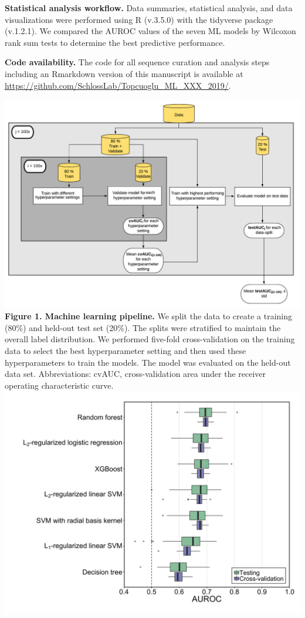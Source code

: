 \documentclass[11pt,]{article}
\begin{document}
\textbf{Statistical analysis workflow.} Data summaries, statistical
analysis, and data visualizations were performed using R (v.3.5.0) with
the tidyverse package (v.1.2.1). We compared the AUROC values of the
seven ML models by Wilcoxon rank sum tests to determine the best
predictive performance.

\textbf{Code availability.} The code for all sequence curation and
analysis steps including an Rmarkdown version of this manuscript is
available at \url{https://github.com/SchlossLab/Topcuoglu_ML_XXX_2019/}.

\newpage

\includegraphics{Figure_1.pdf} \textbf{Figure 1. Machine learning
pipeline. } We split the data to create a training (80\%) and held-out
test set (20\%). The splits were stratified to maintain the overall
label distribution. We performed five-fold cross-validation on the
training data to select the best hyperparameter setting and then used
these hyperparameters to train the models. The model was evaluated on
the held-out data set. Abbreviations: cvAUC, cross-validation area under
the receiver operating characteristic curve. \newpage
\includegraphics{Figure_2.png}
\end{document}
